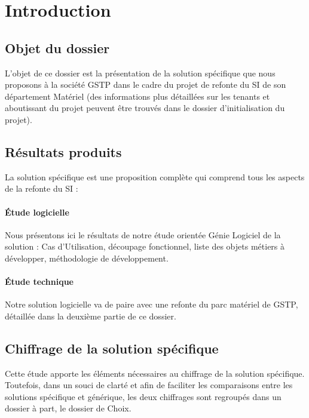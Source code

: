 \section{Introduction}


\subsection{Objet du dossier}

L'objet de ce dossier est la présentation de la solution spécifique que
nous proposons à la société GSTP dans le cadre du projet de refonte du SI
de son département Matériel (des informations plus détaillées sur les
tenants et aboutissant du projet peuvent être trouvés dans le dossier
d'initialisation du projet).


\subsection{Résultats produits}

La solution spécifique est une proposition complète qui comprend tous les
aspects de la refonte du SI :

\paragraph{Étude logicielle}
Nous présentons ici le résultats de notre étude orientée Génie Logiciel de
la solution : Cas d'Utilisation, découpage fonctionnel, liste des objets
métiers à développer, méthodologie de développement.

\paragraph{Étude technique}
Notre solution logicielle va de paire avec une refonte du parc matériel de
GSTP, détaillée dans la deuxième partie de ce dossier.


\subsection{Chiffrage de la solution spécifique}

Cette étude apporte les éléments nécessaires au chiffrage de la solution
spécifique. Toutefois, dans un souci de clarté et afin de faciliter les
comparaisons entre les solutions spécifique et générique, les deux
chiffrages sont regroupés dans un dossier à part, le dossier de Choix.
